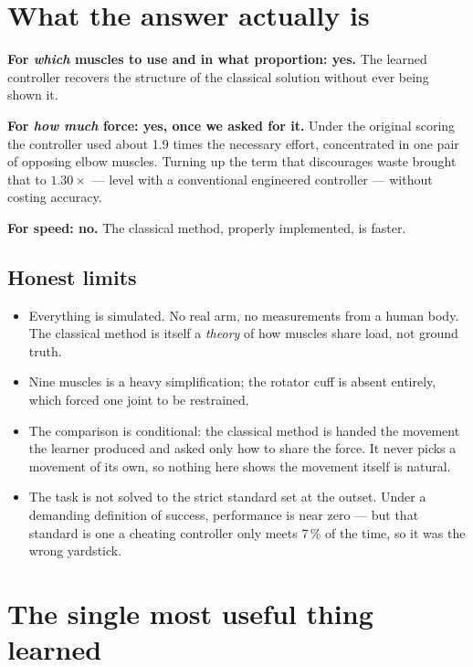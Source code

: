 \documentclass[11pt, a4paper]{article}
\begin{document}
\section{What the answer actually is}

\textbf{For \emph{which} muscles to use and in what proportion: yes.} The learned
controller recovers the structure of the classical solution without ever being
shown it.

\textbf{For \emph{how much} force: yes, once we asked for it.} Under the original
scoring the controller used about 1.9 times the necessary effort, concentrated in
one pair of opposing elbow muscles. Turning up the term that discourages waste
brought that to $1.30\times$ --- level with a conventional engineered controller
--- without costing accuracy.

\textbf{For speed: no.} The classical method, properly implemented, is faster.

\subsection{Honest limits}

\begin{itemize}[leftmargin=1.5em, itemsep=3pt]
\item Everything is simulated. No real arm, no measurements from a human body.
      The classical method is itself a \emph{theory} of how muscles share load,
      not ground truth.
\item Nine muscles is a heavy simplification; the rotator cuff is absent
      entirely, which forced one joint to be restrained.
\item The comparison is conditional: the classical method is handed the movement
      the learner produced and asked only how to share the force. It never picks
      a movement of its own, so nothing here shows the movement itself is
      natural.
\item The task is not solved to the strict standard set at the outset. Under a
      demanding definition of success, performance is near zero --- but that
      standard is one a cheating controller only meets 7\,\% of the time, so it
      was the wrong yardstick.
\end{itemize}

\section{The single most useful thing learned}
\end{document}
